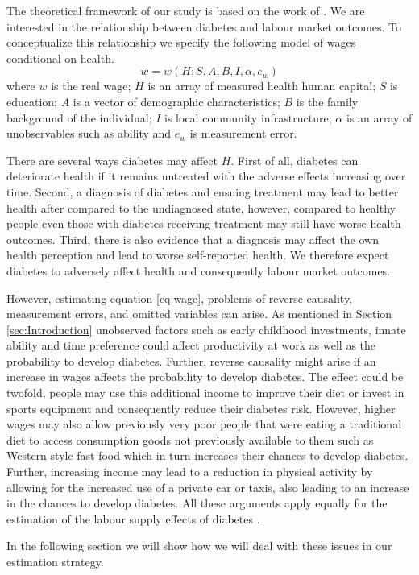 The theoretical framework of our study is based on the work of \citet{Strauss1998}. We are interested in the relationship between diabetes and labour market outcomes. To conceptualize this relationship we specify the following model of wages conditional on health.
\begin{equation}
w=w(H;S,A,B,I,\alpha,e_{w})\label{eq:wage}
\end{equation}
where $w$ is the real wage; $H$ is an array of measured health human capital; $S$ is education; $A$ is a vector of demographic characteristics; $B$ is the family background of the individual; $I$ is local community infrastructure; $\alpha$ is an array of unobservables such as ability and $e_w$ is measurement error. 

There are several ways diabetes may affect $H$. First of all, diabetes can deteriorate health if it remains untreated with the adverse effects increasing over time. Second, a diagnosis of diabetes and ensuing treatment may lead to better health after compared to the undiagnosed state, however, compared to healthy people even those with diabetes receiving treatment may still have worse health outcomes. Third, there is also evidence that a diagnosis may affect the own health perception and lead to worse self-reported health. We therefore expect diabetes to adversely affect health and consequently labour market outcomes.

However, estimating equation  \ref{eq:wage}, problems of reverse causality, measurement errors, and omitted variables can arise. As mentioned in Section  \ref{sec:Introduction} unobserved factors such as early childhood investments, innate ability and time preference could affect productivity at work as well as the probability to develop diabetes. Further, reverse causality might arise if an increase in wages affects the probability to develop diabetes. The effect could be twofold, people may use this additional income to improve their diet or invest in sports equipment and consequently reduce their diabetes risk. However, higher wages may also allow previously very poor people that were eating a traditional diet to access consumption goods not previously available to them such as Western style fast food which in turn increases their chances to develop diabetes. Further, increasing income may lead to a reduction in physical activity by allowing for the increased use of a private car or taxis, also leading to an increase in the chances to develop diabetes. All these arguments apply equally for the estimation of the labour supply effects of diabetes \citep{Strauss2007}.


  

In the following section we will show how we will deal with these issues in our estimation strategy.